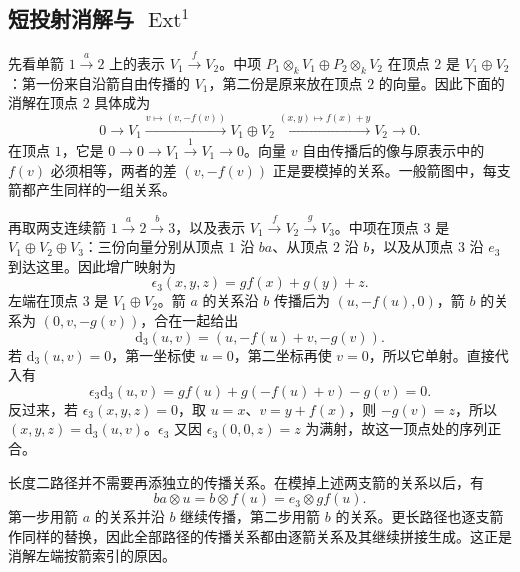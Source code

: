 \subsection{\texorpdfstring{短投射消解与 \(\operatorname{Ext}^1\)}{短投射消解与 Ext1}}
\label{b5:subsec:0904:02}

先看单箭 \(1\xrightarrow{a}2\) 上的表示 \(V_1\xrightarrow{f}V_2\)。中项 \(P_1\otimes_kV_1\oplus P_2\otimes_kV_2\) 在顶点 \(2\) 是 \(V_1\oplus V_2\)：第一份来自沿箭自由传播的 \(V_1\)，第二份是原来放在顶点 \(2\) 的向量。因此下面的消解在顶点 \(2\) 具体成为
\[
	0\longrightarrow V_1\xrightarrow{v\mapsto(v,-f(v))} V_1\oplus V_2\xrightarrow{(x,y)\mapsto f(x)+y} V_2\longrightarrow0.
\]
在顶点 \(1\)，它是 \(0\to0\to V_1\xrightarrow{1}V_1\to0\)。向量 \(v\) 自由传播后的像与原表示中的 \(f(v)\) 必须相等，两者的差 \((v,-f(v))\) 正是要模掉的关系。一般箭图中，每支箭都产生同样的一组关系。

\ProseParagraphBreak

再取两支连续箭 \(1\xrightarrow{a}2\xrightarrow{b}3\)，以及表示 \(V_1\xrightarrow{f}V_2\xrightarrow{g}V_3\)。中项在顶点 \(3\) 是 \(V_1\oplus V_2\oplus V_3\)：三份向量分别从顶点 \(1\) 沿 \(ba\)、从顶点 \(2\) 沿 \(b\)，以及从顶点 \(3\) 沿 \(e_3\) 到达这里。因此增广映射为
\[
	\epsilon_3(x,y,z)=gf(x)+g(y)+z.
\]
左端在顶点 \(3\) 是 \(V_1\oplus V_2\)。箭 \(a\) 的关系沿 \(b\) 传播后为 \((u,-f(u),0)\)，箭 \(b\) 的关系为 \((0,v,-g(v))\)，合在一起给出
\[
	\mathrm{d}_3(u,v)=(u,-f(u)+v,-g(v)).
\]
若 \(\mathrm{d}_3(u,v)=0\)，第一坐标使 \(u=0\)，第二坐标再使 \(v=0\)，所以它单射。直接代入有
\[
	\epsilon_3\mathrm{d}_3(u,v) =gf(u)+g(-f(u)+v)-g(v)=0.
\]
反过来，若 \(\epsilon_3(x,y,z)=0\)，取 \(u=x\)、\(v=y+f(x)\)，则 \(-g(v)=z\)，所以 \((x,y,z)=\mathrm{d}_3(u,v)\)。\(\epsilon_3\) 又因 \(\epsilon_3(0,0,z)=z\) 为满射，故这一顶点处的序列正合。

\ProseParagraphBreak

长度二路径并不需要再添独立的传播关系。在模掉上述两支箭的关系以后，有
\[
	ba\otimes u=b\otimes f(u)=e_3\otimes gf(u).
\]
第一步用箭 \(a\) 的关系并沿 \(b\) 继续传播，第二步用箭 \(b\) 的关系。更长路径也逐支箭作同样的替换，因此全部路径的传播关系都由逐箭关系及其继续拼接生成。这正是消解左端按箭索引的原因。

